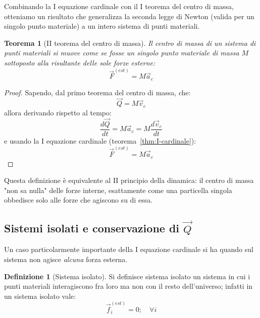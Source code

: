 \documentclass[11pt, a4paper, openright]{book}
\theoremstyle{plain}
\newtheorem{theorem}{Teorema}[section]
\theoremstyle{definition}
\newtheorem{definizione}{Definizione}[section]
\begin{document}
Combinando la I equazione cardinale con il I teorema del centro di
massa, otteniamo un risultato che generalizza la seconda legge di
Newton (valida per un singolo punto materiale) a un intero sistema di
punti materiali.

\begin{theorem}[II teorema del centro di massa]
\label{thm:II-centro-massa}
Il centro di massa di un sistema di punti materiali si muove come se
fosse un singolo punto materiale di massa $M$ sottoposto alla
risultante delle sole forze esterne:
\[\vec{F}^{(est)} = M\vec{a}_c\]
\end{theorem}

\begin{proof}
Sapendo, dal primo teorema del centro di massa, che:
\begin{equation}
    \vec{Q} = M\vec{v}_c
\end{equation}
allora derivando rispetto al tempo:
\begin{equation}
    \frac{d\vec{Q}}{dt} = M\vec{a}_c = M\frac{d\vec{v}_c}{dt}
\end{equation}
e usando la I equazione cardinale (teorema~\ref{thm:I-cardinale}):
\begin{equation}
    \vec{F}^{(est)} = M\vec{a}_c
\end{equation}
\end{proof}

Questa definizione è equivalente al II principio della dinamica:
il centro di massa "non sa nulla" delle forze interne, esattamente come
una particella singola obbedisce solo alle forze che agiscono su di
essa.

\subsection{Sistemi isolati e conservazione di \texorpdfstring{$\vec{Q}$}{Q}}
\label{subsec:sistemi-isolati}

Un caso particolarmente importante della I equazione cardinale si ha
quando sul sistema non agisce \emph{alcuna} forza esterna.

\begin{definizione}[Sistema isolato]
\label{def:sistema-isolato}
Si definisce sistema isolato un sistema in cui i punti materiali
interagiscono fra loro ma non con il resto dell'universo; infatti in un
sistema isolato vale:
\begin{equation}
    \vec{f}_i^{(est)} = 0; \quad \forall i
\end{equation}
\end{definizione}
\end{document}
